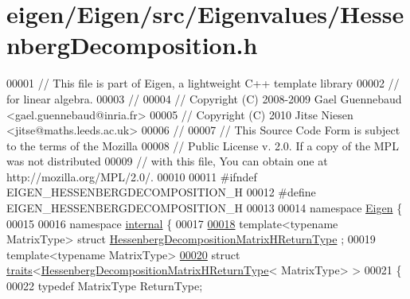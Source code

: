 \hypertarget{eigen_2_eigen_2src_2_eigenvalues_2_hessenberg_decomposition_8h_source}{}\section{eigen/\+Eigen/src/\+Eigenvalues/\+Hessenberg\+Decomposition.h}
\label{eigen_2_eigen_2src_2_eigenvalues_2_hessenberg_decomposition_8h_source}

\begin{DoxyCode}
00001 \textcolor{comment}{// This file is part of Eigen, a lightweight C++ template library}
00002 \textcolor{comment}{// for linear algebra.}
00003 \textcolor{comment}{//}
00004 \textcolor{comment}{// Copyright (C) 2008-2009 Gael Guennebaud <gael.guennebaud@inria.fr>}
00005 \textcolor{comment}{// Copyright (C) 2010 Jitse Niesen <jitse@maths.leeds.ac.uk>}
00006 \textcolor{comment}{//}
00007 \textcolor{comment}{// This Source Code Form is subject to the terms of the Mozilla}
00008 \textcolor{comment}{// Public License v. 2.0. If a copy of the MPL was not distributed}
00009 \textcolor{comment}{// with this file, You can obtain one at http://mozilla.org/MPL/2.0/.}
00010 
00011 \textcolor{preprocessor}{#ifndef EIGEN\_HESSENBERGDECOMPOSITION\_H}
00012 \textcolor{preprocessor}{#define EIGEN\_HESSENBERGDECOMPOSITION\_H}
00013 
00014 \textcolor{keyword}{namespace }\hyperlink{namespace_eigen}{Eigen} \{ 
00015 
00016 \textcolor{keyword}{namespace }\hyperlink{namespaceinternal}{internal} \{
00017   
\hyperlink{group___eigenvalues___module}{00018} \textcolor{keyword}{template}<\textcolor{keyword}{typename} MatrixType> \textcolor{keyword}{struct }\hyperlink{group___eigenvalues___module_struct_eigen_1_1internal_1_1_hessenberg_decomposition_matrix_h_return_type}{HessenbergDecompositionMatrixHReturnType}
      ;
00019 \textcolor{keyword}{template}<\textcolor{keyword}{typename} MatrixType>
\hyperlink{struct_eigen_1_1internal_1_1traits_3_01_hessenberg_decomposition_matrix_h_return_type_3_01_matrix_type_01_4_01_4}{00020} \textcolor{keyword}{struct }\hyperlink{struct_eigen_1_1internal_1_1traits}{traits}<\hyperlink{group___eigenvalues___module_struct_eigen_1_1internal_1_1_hessenberg_decomposition_matrix_h_return_type}{HessenbergDecompositionMatrixHReturnType}<
      MatrixType> >
00021 \{
00022   \textcolor{keyword}{typedef} MatrixType ReturnType;

\end{DoxyCode}
